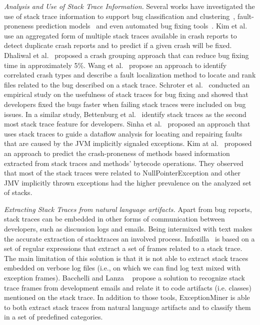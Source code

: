 \documentclass[conference]{IEEEtran}
\begin{document}
\textit{Analysis and Use of Stack Trace Information.} Several works have
investigated the use of stack trace information to support bug classification
and clustering~\cite{wang2013improving, kim2011crash, dhaliwal2011classifying},
fault-proneness prediction models~\cite{kim2013predicting} and even automated
bug fixing tools~\cite{sinha2009fault}. Kim et al.~\cite{kim2011crash} use an
aggregated form of multiple stack traces available in crash reports to detect
duplicate crash reports and to predict if a given crash will be fixed. Dhaliwal
et al.~\cite{dhaliwal2011classifying} proposed a crash grouping approach that
can reduce bug fixing time in approximately 5\%. Wang et
al.~\cite{wang2013improving} propose an approach to identify correlated crash
types and describe a fault localization method to locate and rank files related
to the bug described on a stack trace. Schroter et al.~\cite{schroter2010stack}
conducted an empirical study on the usefulness of stack traces for bug fixing
and showed that developers fixed the bugs faster when failing stack traces were
included on bug issues.  In a similar study, Bettenburg et
al.~\cite{bettenburg2008makes} identify stack traces as the second most stack
trace feature for developers.  Sinha et al.~\cite{sinha2009fault} proposed an
approach that uses stack traces to guide a dataflow analysis for locating and
repairing faults that are caused by the JVM implicitly signaled exceptions. Kim
at al.~\cite{kim2013predicting} proposed an approach to predict the
crash-proneness of methods based information extracted from stack traces and
methods' bytecode operations.  They observed that most of the stack traces were
related to NullPointerException and other JMV implicitly thrown exceptions had
the higher prevalence on the analyzed set of stacks.

\textit{Extracting Stack Traces from natural language artifacts.} 
Apart from bug reports, stack traces can be embedded in other forms of
communication between developers, such as discussion logs and emails.
Being intermixed with text makes the accurate extraction of stacktraces 
an involved process.
Infozilla~\cite{bettenburg2008extracting}
is based on a set of regular expressions that extract a set of frames
related to a stack trace. The main limitation of this solution is that it is not
able to extract stack traces embedded on verbose log files (i.e., on which we
can find log text mixed with exception frames). Bacchelli and Lanza
~\cite{bacchelli2012content} propose a solution to recognize stack trace frames
from development emails and relate it to code artifacts (i.e. classes) mentioned
on the stack trace. In addition to those tools, ExceptionMiner is able to 
both extract stack traces from natural language artifacts and to 
classify them in a set of predefined categories.
\end{document}
